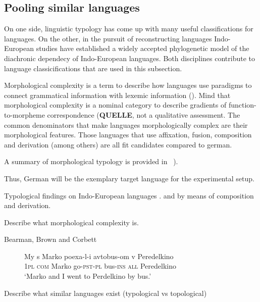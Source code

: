 \subsection{Pooling similar languages}
\label{subsec:german-as-example}



On one side, linguistic typology has come up with many useful classifications for languages.
On the other, in the pursuit of reconstructing languages Indo-European studies have established a widely accepted phylogenetic model of the diachronic dependecy of Indo-European languages.
Both disciplines contribute to language classicifications that are used in this subsection.

Morphological complexity is a term to describe how languages use paradigms to connect grammatical information with lexemic information (\cite{MORPHOLOGICALCOMPLEXITY}).
Mind that morphological complexity is a nominal category to describe gradients of function-to-morpheme correspondence (\textbf{QUELLE}, not a qualitative assessment.
The common denominators that make languages morphologically complex are their morphological features.
Those languages that use affixation, fusion, composition and derivation (among others) are all fit candidates compared to german.

A summary of morphological typology is provided in ~\cite*[78--93]{LINGUISTICTYPOLOGY}).


Thus, German will be the exemplary target language for the experimental setup.

Typological findings on Indo-European languages .
and by means of composition and derivation.





Describe what morphological complexity is.

Bearman, Brown and Corbett


\begin{figure}
    \label{fig:glossing}
    \begin{exe}
        \ex
        \gll  My s Marko poexa-l-i avtobus-om v Peredelkino \\
        1\textsc{pl} \textsc{com} Marko go-\textsc{pst}-\textsc{pl} bus-\textsc{ins} \textsc{all} Peredelkino \\
        \glt  `Marko and I went to Perdelkino by bus.'
    \end{exe}
\end{figure}



Describe what similar languages exist (typological vs topological)

